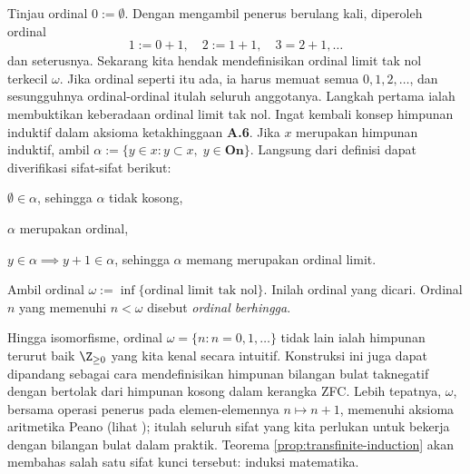 \begin{example} \leavevmode\par
	Tinjau ordinal $0 := \emptyset$. Dengan mengambil penerus berulang kali, diperoleh ordinal
	\[ 1 := 0 + 1, \quad 2 := 1+1, \quad 3=2+1, \ldots \]
	dan seterusnya. Sekarang kita hendak mendefinisikan ordinal limit tak nol terkecil $\omega$. Jika ordinal seperti itu ada, ia harus memuat semua $0,1,2, \ldots$, dan sesungguhnya ordinal-ordinal itulah seluruh anggotanya. Langkah pertama ialah membuktikan keberadaan ordinal limit tak nol. Ingat kembali konsep himpunan induktif dalam aksioma ketakhinggaan \textbf{A.6}. Jika $x$ merupakan himpunan induktif, ambil $\alpha := \{y \in x : y \subset x, \; y \in \textbf{On} \}$. Langsung dari definisi dapat diverifikasi sifat-sifat berikut:
	\begin{inparaenum}[(a)]
		\item $\emptyset \in \alpha$, sehingga $\alpha$ tidak kosong,
		\item $\alpha$ merupakan ordinal,
		\item $y \in \alpha \implies y + 1 \in \alpha$, sehingga $\alpha$ memang merupakan ordinal limit.
	\end{inparaenum}
	Ambil ordinal $\omega := \inf\{ \text{ordinal limit tak nol} \}$. Inilah ordinal yang dicari. Ordinal $n$ yang memenuhi $n < \omega$ disebut \emph{ordinal berhingga}.

	Hingga isomorfisme, ordinal $\omega = \{n : n=0, 1, \ldots \}$ tidak lain ialah himpunan terurut baik $\Z_{\geq 0}$ yang kita kenal secara intuitif. Konstruksi ini juga dapat dipandang sebagai cara mendefinisikan himpunan bilangan bulat taknegatif dengan bertolak dari himpunan kosong dalam kerangka ZFC. Lebih tepatnya, $\omega$, bersama operasi penerus pada elemen-elemennya $n \mapsto n+1$, memenuhi aksioma aritmetika Peano (lihat \cite[Bab 0, \S 2]{DN00}); itulah seluruh sifat yang kita perlukan untuk bekerja dengan bilangan bulat dalam praktik. Teorema \ref{prop:transfinite-induction} akan membahas salah satu sifat kunci tersebut: induksi matematika.
\end{example}

